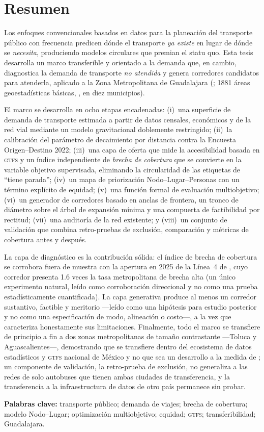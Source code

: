 \chapter*{Resumen}

Los enfoques convencionales basados en datos para la planeación del transporte
público con frecuencia predicen dónde el transporte \emph{ya existe} en lugar de
dónde se \emph{necesita}, produciendo modelos circulares que premian el statu quo.
Esta tesis desarrolla un marco transferible y orientado a la demanda que, en
cambio, diagnostica la demanda de transporte \emph{no atendida} y genera corredores
candidatos para atenderla, aplicado a la Zona Metropolitana de Guadalajara
(\zmg; \num{1881} áreas geoestadísticas básicas, \ageb, en diez municipios).

El marco se desarrolla en ocho etapas encadenadas: (i)~una superficie de demanda de
transporte estimada a partir de datos censales, económicos y de la red vial
mediante un modelo gravitacional doblemente restringido; (ii)~la calibración del
parámetro de decaimiento por distancia contra la Encuesta Origen--Destino 2022;
(iii)~una capa de oferta que mide la accesibilidad basada en \textsc{gtfs} y un
índice independiente de \emph{brecha de cobertura} que se convierte en la variable
objetivo supervisada, eliminando la circularidad de las etiquetas de ``tiene
parada''; (iv)~un mapa de priorización Nodo--Lugar--Personas con un término
explícito de equidad; (v)~una función formal de evaluación multiobjetivo; (vi)~un
generador de corredores basado en anclas de frontera, un tronco de diámetro sobre
el árbol de expansión mínima y una compuerta de factibilidad por rectitud;
(vii)~una auditoría de la red existente; y (viii)~un conjunto de validación que
combina retro-pruebas de exclusión, comparación y métricas de cobertura antes y
después.

La capa de diagnóstico es la contribución sólida: el índice de brecha de cobertura
se corrobora fuera de muestra con la apertura en 2025 de la Línea~4 de \zmg, cuyo
corredor presenta \num{1.6} veces la tasa metropolitana de brecha alta (un único
experimento natural, leído como corroboración direccional y no como una prueba
estadísticamente cuantificada). La capa
generativa produce al menos un corredor sustantivo, factible y meritorio ---leído
como una hipótesis para estudio posterior y no como una especificación de modo,
alineación o costo---, a la vez
que caracteriza honestamente sus limitaciones. Finalmente, todo el marco se
transfiere de principio a fin a dos zonas metropolitanas de tamaño contrastante
---Toluca y Aguascalientes---, demostrando que se transfiere dentro del ecosistema
de datos estadísticos y \textsc{gtfs} nacional de México y no que sea un desarrollo
a la medida de \zmg; un componente de validación, la retro-prueba de exclusión, no
generaliza a las redes de solo autobuses que tienen ambas ciudades de transferencia,
y la transferencia a la infraestructura de datos de otro país permanece sin probar.

\vspace{1em}
\noindent\textbf{Palabras clave:} transporte público; demanda de viajes; brecha de
cobertura; modelo Nodo--Lugar; optimización multiobjetivo; equidad; \textsc{gtfs};
transferibilidad; Guadalajara.

\clearpage
